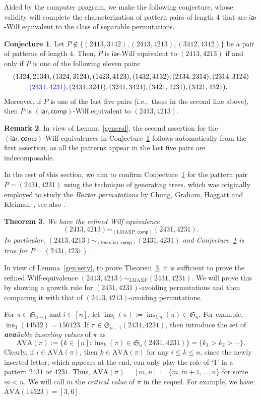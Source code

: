 \documentclass[12pt]{amsart}
\numberwithin{equation}{section}
\def\blue{\textcolor{blue}}
\theoremstyle{plain}
\newtheorem{theorem}{Theorem}[section]
\theoremstyle{definition}
\newtheorem{conj}[theorem]{Conjecture}
\newtheorem{remark}[theorem]{Remark}
\def\S{\mathfrak{S}}
\def\iar{\mathsf{iar}}
\def\comp{\mathsf{comp}}
\def\LMAXP{\mathrm{LMAXP}}
\def\ins{\operatorname{ins}}
\def\lmax{\mathsf{lmax}}
\def\lmax{\mathsf{lmax}}
\def\AVA{\mathrm{AVA}}
\begin{document}
Aided by the computer program, we make the following conjecture, whose validity will complete the characterization of pattern pairs of length $4$ that are  $\iar$-Wilf equivalent to the class of separable permutations.
\begin{conj}\label{schroder:iar}
Let $P\notin\{(2413,3142),(2413,4213),(3412,4312)\}$ be a pair of patterns of length $4$. Then,
$P$ is $\iar$-Wilf equivalent to $(2413,4213)$
  if and only if $P$ is one of the following eleven  pairs:
 \begin{align*}
 &(1324,2134),(1324,3124),(1423,4123),(1432,4132),(2134,2314),(2314,3124) \nonumber\\
 &\,\,\qquad\blue{(2431,4231)},(2431,3241),(3241,3421),(3421,4231),(3421,4321).
 \end{align*}
 Moreover, if $P$ is one of the last five pairs (i.e.,~those in the second line above), then $P$ is $(\iar,\comp)$-Wilf equivalent to $(2413,4213)$. 
\end{conj}
\begin{remark}
In view of Lemma~\ref{general}, the second assertion for the $(\iar,\comp)$-Wilf equivalences in Conjecture~\ref{schroder:iar} follows automatically from the first assertion, as all the patterns appear in the last five pairs are indecomposable.   
\end{remark}
In the rest of this section, we aim to confirm Conjecture~\ref{schroder:iar} for  the pattern pair $P=(2431,4231)$ using the technique of generating trees, which was originally employed  to study the {\em Baxter permutations} by  Chung, Graham, Hoggatt and Kleiman~\cite{chung}, see also \cite{SS,wes}. 


\begin{theorem}\label{sch:last}
We have the refined Wilf equivalence 
$$(2413,4213)\sim_{(\LMAXP,\comp)}(2431,4231).$$
In particular, $(2413,4213)\sim_{(\lmax,\iar,\comp)}(2431,4231)$ and Conjecture~\ref{schroder:iar} is true for  $P=(2431,4231)$. 
\end{theorem}


In view of Lemma~\ref{gen:setv}, to prove Theorem~\ref{sch:last}, it is sufficient to prove the refined Wilf-equivalence $(2413,4213)\sim_{\LMAXP}(2431,4231)$. We will prove this by showing a growth  rule for $(2431,4231)$-avoiding permutations and then comparing  it with that of $(2413,4213)$-avoiding permutations. 

For $\pi\in\S_{n-1}$ and $i\in[n]$, let $\ins_i(\pi):=\ins_{i,n}(\pi)\in\S_{n}$. For example, $\ins_3(14532)=156423$. If $\pi\in\S_{n-1}(2431,4231)$, then introduce the set of {\em{\bf\em ava}ilable inserting values} of $\pi$ as
$$
\AVA(\pi):=\{k\in[n]: \ins_k(\pi)\in\S_{n}(2431,4231)\}=\{k_1>k_2>\cdots\}.
$$
 Clearly, if $i\in\AVA(\pi)$, then $k\in\AVA(\pi)$ for any $i\leq k\leq n$, since the newly inserted letter, which appears at the end, can only play the role of `1' in a pattern $2431$ or $4231$. Thus, $\AVA(\pi)=[m,n]:=\{m,m+1,\ldots,n\}$ for some $m<n$. We will call $m$ the {\em critical value} of $\pi$ in the sequel.
For example, we have $\AVA(14523)=[3,6]$.
\end{document}
